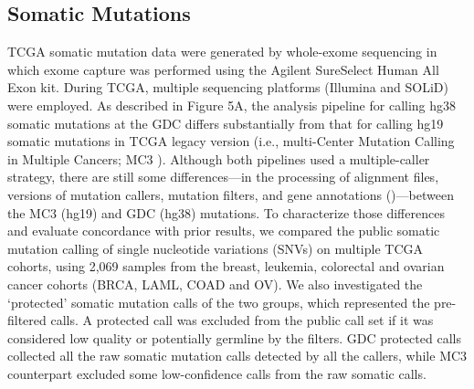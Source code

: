 \subsection{Somatic Mutations}
TCGA somatic mutation data were generated by whole-exome sequencing in which exome capture was performed using the Agilent SureSelect Human All Exon kit. During TCGA, multiple sequencing platforms (Illumina and SOLiD) were employed. As described in Figure 5A, the analysis pipeline for calling hg38 somatic mutations at the GDC differs substantially from that for calling hg19 somatic mutations in TCGA legacy version (i.e., multi-Center Mutation Calling in Multiple Cancers; MC3 \cite{ellrottk_tcga:MC3MutationCalling2018}).
Although both pipelines used a multiple-caller strategy, there are still some differences---in the processing of alignment files, versions of mutation callers, mutation filters, and gene annotations ()---between the MC3 (hg19) and GDC (hg38) mutations.
To characterize those differences and evaluate concordance with prior results, we compared the public somatic mutation calling of single nucleotide variations (SNVs) on multiple TCGA cohorts, using 2,069 samples from the breast, leukemia, colorectal and ovarian cancer cohorts (BRCA, LAML, COAD and OV). We also investigated the `protected' somatic mutation calls of the two groups, which represented the pre-filtered calls. A protected call was excluded from the public call set if it was considered low quality or potentially germline by the filters. GDC protected calls collected all the raw somatic mutation calls detected by all the callers, while MC3 counterpart excluded some low-confidence calls from the raw somatic calls.

